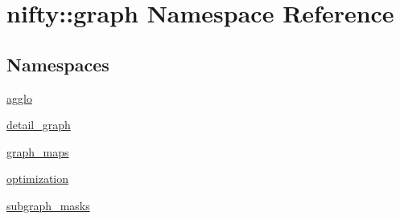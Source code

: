 \hypertarget{namespacenifty_1_1graph}{}\section{nifty\+:\+:graph Namespace Reference}
\label{namespacenifty_1_1graph}
\subsection*{Namespaces}
\begin{DoxyCompactItemize}
\item 
 \hyperlink{namespacenifty_1_1graph_1_1agglo}{agglo}
\item 
 \hyperlink{namespacenifty_1_1graph_1_1detail__graph}{detail\+\_\+graph}
\item 
 \hyperlink{namespacenifty_1_1graph_1_1graph__maps}{graph\+\_\+maps}
\item 
 \hyperlink{namespacenifty_1_1graph_1_1optimization}{optimization}
\item 
 \hyperlink{namespacenifty_1_1graph_1_1subgraph__masks}{subgraph\+\_\+masks}
\end{DoxyCompactItemize}
